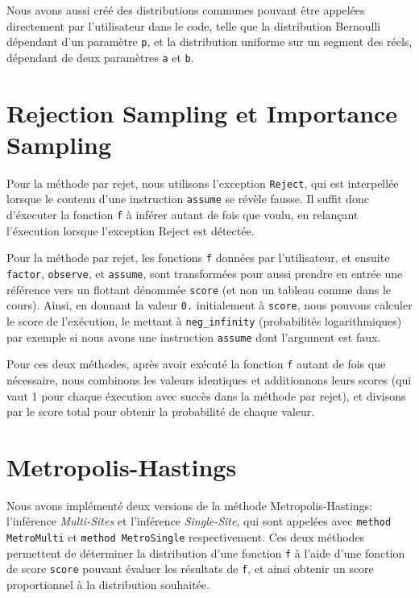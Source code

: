 \documentclass[svgnames]{article}
\begin{document}
Nous avons aussi créé des distributions communes pouvant être appelées directement par l'utilisateur dans le code, telle que la distribution Bernoulli dépendant d'un paramètre \texttt p, et la distribution uniforme sur un segment des réels, dépendant de deux paramètres \texttt a et \texttt b.

\section{Rejection Sampling et Importance Sampling}

Pour la méthode par rejet, nous utilisons l'exception \texttt{Reject}, qui est interpellée lorsque le contenu d'une instruction \texttt{assume} se révèle fausse. Il suffit donc d'éxecuter la fonction \texttt{f} à inférer autant de fois que voulu, en relançant l'éxecution lorsque l'exception Reject est détectée.

Pour la méthode par rejet, les fonctions \texttt f données par l'utilisateur, et ensuite \texttt{factor}, \texttt{observe}, et \texttt{assume}, sont transformées pour aussi prendre en entrée une référence vers un flottant dénommée \texttt{score} (et non un tableau comme dans le cours). Ainsi, en donnant la valeur \texttt{0.} initialement à \texttt{score}, nous pouvons calculer le score de l'exécution, le mettant à \verb|neg_infinity| (probabilités logarithmiques) par exemple si nous avons une instruction \texttt{assume} dont l'argument est faux.

Pour ces deux méthodes, après avoir exécuté la fonction \texttt{f} autant de fois que nécessaire, nous combinons les valeurs identiques et additionnons leurs scores (qui vaut 1 pour chaque éxecution avec succès dans la méthode par rejet), et divisons par le score total pour obtenir la probabilité de chaque valeur.

\section{Metropolis-Hastings}

Nous avons implémenté deux versions de la méthode Metropolis-Hastings: l'inférence \emph{Multi-Sites} et l'inférence \emph{Single-Site}, qui sont appelées avec \lstinline{method MetroMulti}  et \lstinline{method MetroSingle} respectivement. Ces deux méthodes permettent de déterminer la distribution d'une fonction \verb|f| à l'aide d'une fonction de score \verb|score| pouvant évaluer les résultats de \verb|f|, et ainsi obtenir un score proportionnel à la distribution souhaitée.
\end{document}
